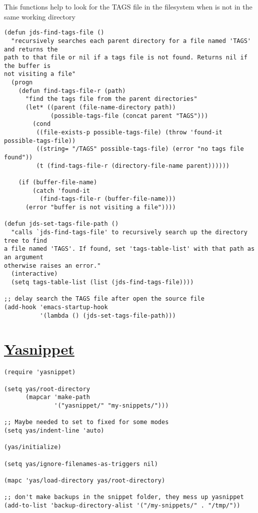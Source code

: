 \documentclass[11pt]{article}
\begin{document}
   This functions help to look for the TAGS file in the filesystem when is not in the same working directory
\begin{verbatim}
(defun jds-find-tags-file ()
  "recursively searches each parent directory for a file named 'TAGS' and returns the
path to that file or nil if a tags file is not found. Returns nil if the buffer is
not visiting a file"
  (progn
    (defun find-tags-file-r (path)
      "find the tags file from the parent directories"
      (let* ((parent (file-name-directory path))
             (possible-tags-file (concat parent "TAGS")))
        (cond
         ((file-exists-p possible-tags-file) (throw 'found-it possible-tags-file))
         ((string= "/TAGS" possible-tags-file) (error "no tags file found"))
         (t (find-tags-file-r (directory-file-name parent))))))

    (if (buffer-file-name)
        (catch 'found-it 
          (find-tags-file-r (buffer-file-name)))
      (error "buffer is not visiting a file"))))

(defun jds-set-tags-file-path ()
  "calls `jds-find-tags-file' to recursively search up the directory tree to find
a file named 'TAGS'. If found, set 'tags-table-list' with that path as an argument
otherwise raises an error."
  (interactive)
  (setq tags-table-list (list (jds-find-tags-file))))

;; delay search the TAGS file after open the source file
(add-hook 'emacs-startup-hook 
          '(lambda () (jds-set-tags-file-path)))
\end{verbatim}
\section{\href{http://code.google.com/p/yasnippet/}{Yasnippet}}
\label{sec-26}

\begin{verbatim}
(require 'yasnippet)

(setq yas/root-directory
      (mapcar 'make-path
              '("yasnippet/" "my-snippets/")))

;; Maybe needed to set to fixed for some modes
(setq yas/indent-line 'auto)

(yas/initialize)

(setq yas/ignore-filenames-as-triggers nil)

(mapc 'yas/load-directory yas/root-directory)

;; don't make backups in the snippet folder, they mess up yasnippet
(add-to-list 'backup-directory-alist '("/my-snippets/" . "/tmp/"))
\end{verbatim}
\end{document}
